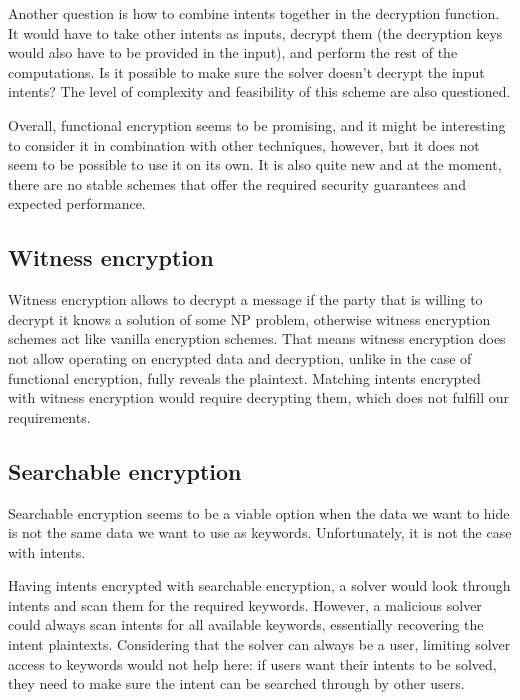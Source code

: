 \documentclass[
    9pt,            %
    report,        %
    affiltop,       %
]{art}
\begin{document}
Another question is how to combine intents together in the decryption function. It would have to take other intents as inputs, decrypt them (the decryption keys would also have to be provided in the input), and perform the rest of the computations. Is it possible to make sure the solver doesn't decrypt the input intents? The level of complexity and feasibility of this scheme are also questioned.

Overall, functional encryption seems to be promising, and it might be interesting to consider it in combination with other techniques, however, but it does not seem to be possible to use it on its own. It is also quite new and at the moment, there are no stable schemes that offer the required security guarantees and expected performance.


\subsection{Witness encryption}\label{WE-expanded}

Witness encryption allows to decrypt a message if the party that is willing to decrypt it knows a solution of some NP problem, otherwise witness encryption schemes act like vanilla encryption schemes. That means witness encryption does not allow operating on encrypted data and decryption, unlike in the case of functional encryption, fully reveals the plaintext. Matching intents encrypted with witness encryption would require decrypting them, which does not fulfill our requirements.

\subsection{Searchable encryption}\label{SE-expanded}

Searchable encryption seems to be a viable option when the data we want to hide is not the same data we want to use as keywords. Unfortunately, it is not the case with intents.

Having intents encrypted with searchable encryption, a solver would look through intents and scan them for the required keywords. However, a malicious solver could always scan intents for all available keywords, essentially recovering the intent plaintexts. Considering that the solver can always be a user, limiting solver access to keywords would not help here: if users want their intents to be solved, they need to make sure the intent can be searched through by other users. 
\end{document}
